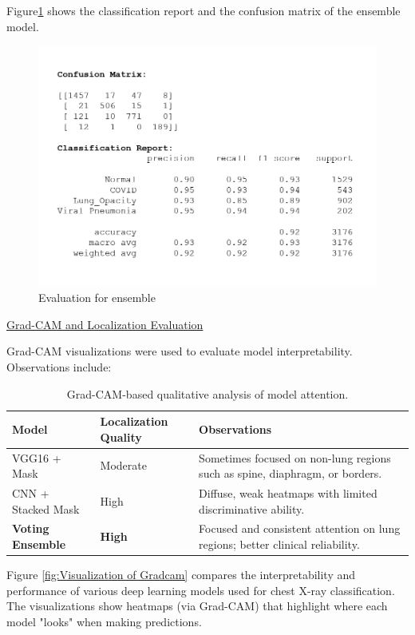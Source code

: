 \documentclass{article}
\begin{document}
Figure\ref{fig:Confusion matrix for ensemble} shows the classification report and the confusion matrix of the ensemble model.

\begin{figure}%
    \centering
    \includegraphics[width=0.5\linewidth]{cm_cr_ensemble.png}
    \caption{Evaluation for ensemble}
    \label{fig:Confusion matrix for ensemble}
\end{figure}

\underline{Grad-CAM and Localization Evaluation}

Grad-CAM visualizations were used to evaluate model interpretability. Observations include:

\begin{table}[H]
\centering
\begin{tabular}{|l|l|p{8cm}|}
\hline
\textbf{Model} & \textbf{Localization Quality} & \textbf{Observations} \\
\hline
VGG16 + Mask & Moderate  & Sometimes focused on non-lung regions such as spine, diaphragm, or borders. \\
\hline
CNN + Stacked Mask & High  & Diffuse, weak heatmaps with limited discriminative ability. \\
\hline
\textbf{Voting Ensemble} & \textbf{High} & Focused and consistent attention on lung regions; better clinical reliability. \\
\hline
\end{tabular}
\caption{Grad-CAM-based qualitative analysis of model attention.}
\end{table}


Figure \ref{fig:Visualization of Gradcam} compares the interpretability and performance of various deep learning models used for chest X-ray classification. The visualizations show heatmaps (via Grad-CAM) that highlight where each model "looks" when making predictions.
\end{document}
